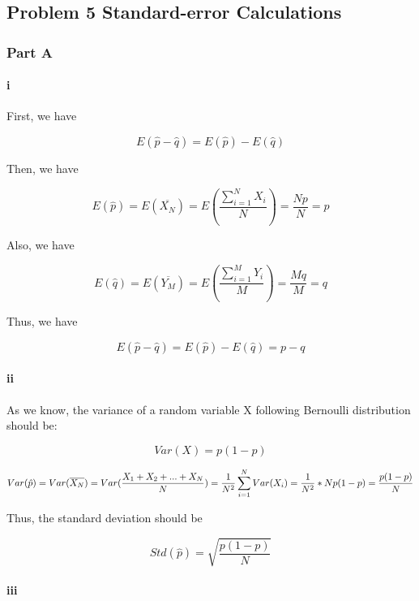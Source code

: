 \documentclass[
]{article}
\begin{document}
\hypertarget{problem-5-standard-error-calculations}{%
\subsection{Problem 5 Standard-error Calculations}\label{problem-5-standard-error-calculations}}

\hypertarget{part-a-10}{%
\subsubsection{Part A}\label{part-a-10}}

\hypertarget{i-1}{%
\paragraph{i}\label{i-1}}

First, we have

\[
E(\hat{p}-\hat{q}) = E(\hat{p})-E(\hat{q})
\]

Then, we have

\[
E(\hat{p}) = E(\overline{X_N}) = E(\frac{\sum_{i=1}^{N} X_i}{N}) = \frac{Np}{N} = p
\]

Also, we have

\[
E(\hat{q}) = E(\overline{Y_M}) = E(\frac{\sum_{i=1}^{M} Y_i}{M}) = \frac{Mq}{M} = q
\]

Thus, we have

\[
E(\hat{p}-\hat{q}) = E(\hat{p})-E(\hat{q})=p-q
\]

\hypertarget{ii-1}{%
\paragraph{ii}\label{ii-1}}

As we know, the variance of a random variable X following Bernoulli distribution should be:

\[
Var(X) = p(1-p)
\]

\[
Var(\hat{p}) = Var(\overline{X_N}) = Var(\frac{X_1+X_2+...+X_N}{N})\\=\frac{1}{N^2}\sum_{i=1}^{N}Var(X_i) = \frac{1}{N^2}*Np(1-p)=\frac{p(1-p)}{N}
\]

Thus, the standard deviation should be

\[
Std(\hat{p}) = \sqrt{\frac{p(1-p)}{N}}
\]

\hypertarget{iii-1}{%
\paragraph{iii}\label{iii-1}}
\end{document}
